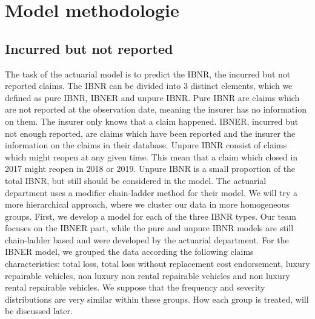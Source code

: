 \section{Model methodologie}\label{Sect_Methodologie}
\subsection{Incurred but not reported}
	The task of the actuarial model is to predict the IBNR, the incurred but not reported claims. The IBNR can be divided into 3 distinct elements, which we defined as pure IBNR, IBNER and unpure IBNR. Pure IBNR are claims which are not reported at the observation date, meaning the insurer has no information on them. The insurer only knows that a claim happened. IBNER, incurred but not enough reported, are claims which have been reported and the insurer the information on the claims in their database. Unpure IBNR consist of claims which might reopen at any given time. This mean that a claim which closed in 2017 might reopen in 2018 or 2019. Unpure IBNR is a small proportion of the total IBNR, but still should be considered in the model.
	The actuarial department uses a modifier chain-ladder method for their model. We will try a more hierarchical approach, where we cluster our data in more homogeneous groups. First, we develop a model for each of the three IBNR types. Our team focuses on the IBNER part, while the pure and unpure IBNR models are still chain-ladder based and were developed by the actuarial department. For the IBNER model, we grouped the data according the following claims characteristics:  total loss, total loss without replacement cost endorsement, luxury repairable vehicles, non luxury non rental repairable vehicles and non luxury rental repairable vehicles. We suppose that the frequency and severity distributions are very similar within these groups. How each group is treated, will be discussed later. 
